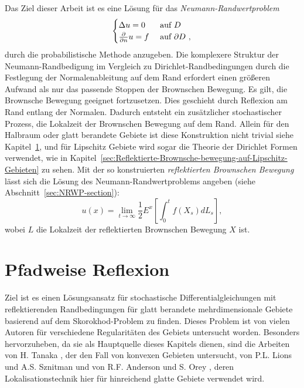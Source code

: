 \documentclass[10pt, a4paper, leqno, twoside, bibliography=totocnumbered, final]{scrartcl}
\theoremstyle{definition}
\theoremstyle{plain}%
\theoremstyle{remark}
\begin{document}
Das Ziel dieser Arbeit ist es eine Lösung für das \emph{Neumann-Randwertproblem}
\begin{equation}
\begin{cases}
\Delta u = 0 & \text{ auf $D$ }\\
\frac{\partial}{\partial n} u = f & \text{ auf $ \partial D $ },
\end{cases}
\end{equation}
durch die probabilistische Methode anzugeben. Die komplexere Struktur der Neumann-Randbedigung im Vergleich zu Dirichlet-Randbedingungen durch die Festlegung der Normalenableitung auf dem Rand erfordert einen größeren Aufwand als nur das passende Stoppen der Brownschen Bewegung. Es gilt, die Brownsche Bewegung geeignet fortzusetzen. Dies geschieht durch Reflexion am Rand entlang der Normalen. Dadurch entsteht ein zusätzlicher stochastischer Prozess, die Lokalzeit der Brownschen Bewegung auf dem Rand. Allein für den Halbraum oder glatt berandete Gebiete ist diese Konstruktion nicht trivial  siehe Kapitel~\ref{sec:Pfadweise-Reflexion}, und für Lipschitz Gebiete wird sogar die Theorie der Dirichlet Formen verwendet, wie in Kapitel~\ref{sec:Reflektierte-Brownsche-bewegung-auf-Lipschitz-Gebieten} zu sehen. Mit der so konstruierten \emph{reflektierten Brownschen Bewegung} lässt sich die Lösung des Neumann-Randwertproblems angeben (siehe Abschnitt~\ref{sec:NRWP-section}):
\begin{equation}
u(x) = \lim_{t \to \infty} \frac{1}{2} E^x \left[ \int_0^t f(X_s) dL_s \right],
\end{equation}
wobei $ L $ die Lokalzeit der reflektierten Brownschen Bewegung $ X $ ist.




\newpage

\section{Pfadweise Reflexion}
\label{sec:Pfadweise-Reflexion}

Ziel ist es einen Lösungsansatz für stochastische Differentialgleichungen mit reflektierenden Randbedingungen für glatt berandete mehrdimensionale Gebiete basierend auf dem Skorokhod-Problem zu finden.
Dieses Problem ist von vielen Autoren für verschiedene Regularitäten des Gebiets untersucht worden. Besonders hervorzuheben, da sie als Hauptquelle dieses Kapitels dienen, sind die Arbeiten von H. Tanaka \cite{Tanaka}, der den Fall von konvexen Gebieten untersucht, von P.L. Lions und A.S. Sznitman \cite{Lions-Sznitman} und von R.F. Anderson und S. Orey \cite{Anderson-Orey}, deren Lokalisationstechnik hier für hinreichend glatte Gebiete verwendet wird. 
\end{document}
